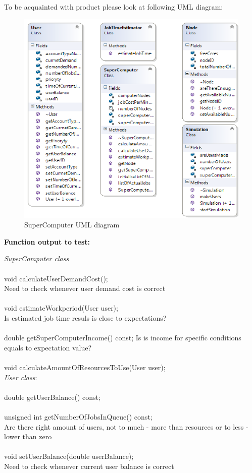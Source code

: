 \documentclass{scrreprt}
\begin{document}
To be acquainted with product please look at following UML diagram:
\begin{figure}[h!]
\centering
\includegraphics{ClassDiagram.png}
\caption{SuperComputer UML diagram}

\end{figure}
\FloatBarrier

\textbf{Function output to test:}

\textit{SuperComputer class}
\\
\\
void calculateUserDemandCost();
\\
Need to check whenever user demand cost is correct
\\
\\
void estimateWorkperiod(User user);
\\
Is estimated job time resuls is close to expectations?
\\
\\
double getSuperComputerIncome() const;
Is is income for specific conditions equals to expectation value?
\\
\\
void calculateAmountOfResourcesToUse(User user);
\\


\textit{User class}:
\\
\\
double getUserBalance() const;
\\
\\
    unsigned int getNumberOfJobsInQueue() const; \\
    Are there right amount of users, not to much - more than resources or to less - lower than zero
\\
\\
    void setUserBalance(double userBalance);\\
    Need to check whenever current user balance is correct
\\
\\
\end{document}
